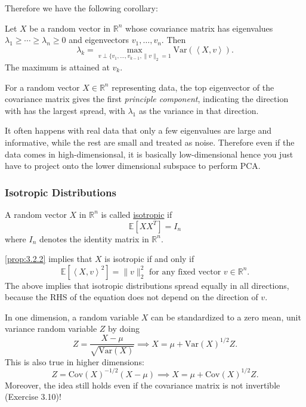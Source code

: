 Therefore we have the following corollary: 
\begin{corollary}[PCA]
\label{cor:3.2.4}
Let $X$ be a random vector in $\mathbb{R}^n$ whose covariance matrix has eigenvalues $\lambda_1 \geq \cdots 
\geq \lambda_n \geq 0$ and eigenvectors $v_1, \dots, v_n$. Then 
\[ \lambda_k = \max_{v \perp \{v_1, \dots, v_{k - 1}, \lVert v \rVert_{2} = 1} 
\mathrm{Var}(\left\langle X, v \right\rangle). \]
The maximum is attained at $v_k$.
\end{corollary}	

For a random vector $X \in \mathbb{R}^n$ representing data, 
the top eigenvector of the covariance matrix gives the first \textit{principle component}, indicating the 
direction with has the largest spread, with $\lambda_1$ as the variance in that direction.

\begin{remark}
\label{rmk:3.2.5}
It often happens with real data that only a few eigenvalues are large and informative, while the rest are 
small and treated as noise. Therefore even if the data comes in high-dimensionsal, it is basically 
low-dimensional hence you just have to project onto the lower dimensional subspace to perform PCA.
\end{remark}


\subsubsection{Isotropic Distributions}
\begin{definition}[]
\label{def:3.2.6}
A random vector $X$ in $\mathbb{R}^n$ is called \underline{isotropic} if 
\[ \mathbb{E}[XX^T] = I_n \]
where $I_n$ denotes the identity matrix in $\mathbb{R}^n$.
\end{definition}

\cref{prop:3.2.2} implies that $X$ is isotropic if and only if 
\[ \mathbb{E}[\left\langle X, v \right\rangle^2] = \lVert v \rVert_{2}^2 \text{ for any fixed 
vector } v \in \mathbb{R}^n. \]
The above implies that isotropic distributions spread equally in all directions, because the RHS of the 
equation does not depend on the direction of $v$.

\begin{remark}[Standardizing]
\label{rmk:3.2.7}
In one dimension, a random variable $X$ can be standardized to a zero mean, unit variance random variable 
$Z$ by doing 
\[ Z = \frac{X - \mu}{\sqrt{\mathrm{Var}(X)}} \implies X = \mu + \mathrm{Var}(X)^{1/2}Z. \]
This is also true in higher dimensions: 
\[ Z = \mathrm{Cov}(X)^{-1/2}(X - \mu) \implies X = \mu + \mathrm{Cov}(X)^{1/2}Z. \]
Moreover, the idea still holds even if the covariance matrix is not invertible (Exercise 3.10)!
\end{remark}


